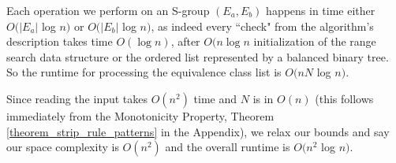 Each operation we perform on an S-group $(E_a,E_b)$ happens in time either
$O(|E_a|$ log $n)$ or $O(|E_b|$ log $n)$, as indeed
every ``check" from the algorithm's description takes time $O(\log n)$,
after $O(n \log n$ initialization of the range search data structure
or the ordered list represented by a balanced binary tree.
So the runtime for processing the equivalence class list is $O(nN$ log $n)$.

Since reading the input takes $O(n^2)$ time and $N$ is in $O(n)$
(this follows immediately from the Monotonicity Property,
 Theorem \ref{theorem_strip_rule_patterns} in the Appendix),
 we relax our bounds and say our space complexity is $O(n^2)$
 and the overall runtime is $O(n^2$ log $n)$.

